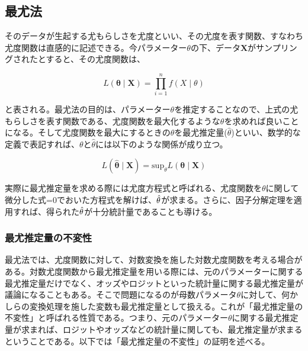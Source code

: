 \documentclass[a4paper,dvipdfmx]{jsarticle}
\begin{document}
\subsection{最尤法}
そのデータが生起する尤もらしさを尤度といい、その尤度を表す関数、すなわち尤度関数は直感的に記述できる。今パラメーター$\theta$の下、データ$\bm{X}$がサンプリングされたとすると、その尤度関数は、

\begin{equation}
  L(\bm{\theta} \mid \bm{X}) = \prod_{i=1}^n f(X \mid \theta)
\end{equation}

と表される。最尤法の目的は、パラメーター$\theta$を推定することなので、上式の尤もらしさを表す関数である、尤度関数を最大化するような$\theta$を求めれば良いことになる。そして尤度関数を最大にするときの$\theta$を最尤推定量($\hat{\theta}$)といい、数学的な定義で表記すれば、$\theta$と$\hat{\theta}$には以下のような関係が成り立つ。

\begin{equation}
  L(\bm{\hat{\theta}} \mid \bm{X}) = \mathrm{sup}_\theta L(\bm{\theta} \mid \bm{X})
\end{equation}



実際に最尤推定量を求める際には尤度方程式と呼ばれる、尤度関数を$\theta$に関して微分した式=0でおいた方程式を解けば、$\hat{\bf{\theta}}$が求まる。さらに、因子分解定理を適用すれば、得られた$\hat{\bf{\theta}}$が十分統計量であることも導ける。

\subsubsection*{最尤推定量の不変性}
最尤法では、尤度関数に対して、対数変換を施した対数尤度関数を考える場合がある。対数尤度関数から最尤推定量を用いる際には、元のパラメーターに関する最尤推定量だけでなく、オッズやロジットといった統計量に関する最尤推定量が議論になることもある。そこで問題になるのが母数パラメータ$\theta$に対して、何かしらの変換処理を施した変数も最尤推定量として扱える。これが「最尤推定量の不変性」と呼ばれる性質である。つまり、元のパラメーター$\theta$に関する最尤推定量が求まれば、ロジットやオッズなどの統計量に関しても、最尤推定量が求まるということである。以下では「最尤推定量の不変性」の証明を述べる。
\end{document}
